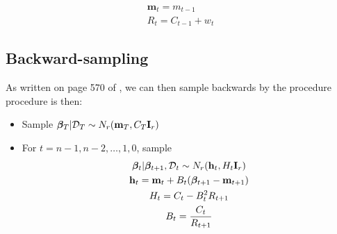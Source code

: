 \documentclass{article}
\begin{document}
\begin{gather}
  \mathbf{m}_{t}=m_{t-1} \\
  R_{t} = C_{t-1} + w_{t}
\end{gather}

\subsection{Backward-sampling}

As written on page 570 of \cite{west1997}, we can then
sample backwards by the procedure procedure is then:

\begin{itemize}
\item Sample $\bm\beta_{T}|{\cal D}_{T} \sim N_{r}(\mathbf{m}_{T}, C_{T}\mathbf{I}_{r})$
\item For $t=n-1,n-2,\dots,1,0$, sample
  \begin{gather}
  \bm\beta_{t}|\bm\beta_{t+1},{\cal D}_{t} \sim N_{r}(\mathbf{h}_{t},
  H_{t}\mathbf{I}_{r}) \\
  \mathbf{h}_{t} = \mathbf{m}_{t} + B_{t}
  (\bm\beta_{t+1}-\mathbf{m}_{t+1}) \\
  H_{t} = C_{t} - B_{t}^{2}R_{t+1} \\
  B_{t} = \frac{C_{t}}{R_{t+1}}
\end{gather}
\end{itemize}




\newpage
\end{document}
